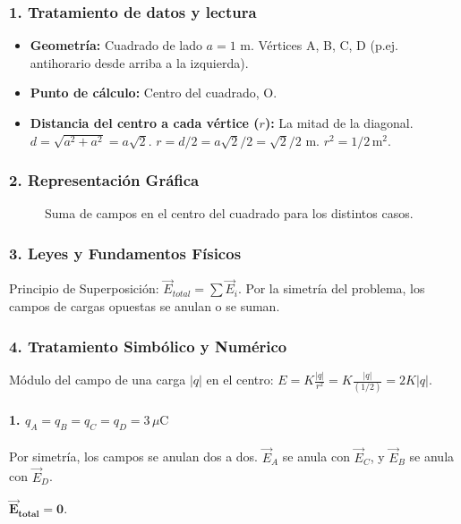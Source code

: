\subsubsection*{1. Tratamiento de datos y lectura}
\begin{itemize}
    \item \textbf{Geometría:} Cuadrado de lado $a=1$ m. Vértices A, B, C, D (p.ej. antihorario desde arriba a la izquierda).
    \item \textbf{Punto de cálculo:} Centro del cuadrado, O.
    \item \textbf{Distancia del centro a cada vértice ($r$):} La mitad de la diagonal. $d = \sqrt{a^2+a^2} = a\sqrt{2}$. $r = d/2 = a\sqrt{2}/2 = \sqrt{2}/2$ m. $r^2 = 1/2 \, \text{m}^2$.
\end{itemize}

\subsubsection*{2. Representación Gráfica}
\begin{figure}[H]
    \centering
    \caption{Suma de campos en el centro del cuadrado para los distintos casos.}
\end{figure}

\subsubsection*{3. Leyes y Fundamentos Físicos}
Principio de Superposición: $\vec{E}_{total} = \sum \vec{E}_i$. Por la simetría del problema, los campos de cargas opuestas se anulan o se suman.

\subsubsection*{4. Tratamiento Simbólico y Numérico}
Módulo del campo de una carga $|q|$ en el centro: $E = K\frac{|q|}{r^2} = K\frac{|q|}{(1/2)} = 2K|q|$.

\paragraph*{1. $q_A=q_B=q_C=q_D=3\,\mu\text{C}$}
Por simetría, los campos se anulan dos a dos. $\vec{E}_A$ se anula con $\vec{E}_C$, y $\vec{E}_B$ se anula con $\vec{E}_D$.
\begin{cajaresultado}
    $\boldsymbol{\vec{E}_{total} = 0}$.
\end{cajaresultado}

